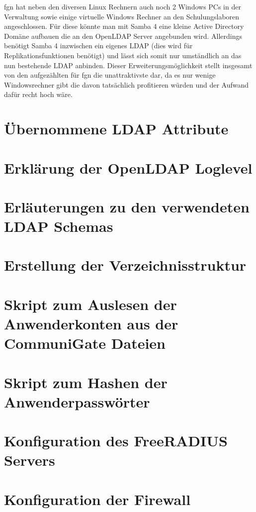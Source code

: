 \documentclass[11pt,a4paper,titlepage=firstiscover]{scrartcl} %
\begin{document}
fgn hat neben den diversen Linux Rechnern auch noch 2 Windows PCs in der Verwaltung sowie einige virtuelle Windows Rechner an den Schulungslaboren angeschlossen. Für diese könnte man mit Samba 4 eine kleine Active Directory Domäne aufbauen die an den OpenLDAP Server angebunden wird. Allerdings benötigt Samba 4 inzwischen ein eigenes LDAP (dies wird für Replikationsfunktionen benötigt) und lässt sich somit nur umständlich an das nun bestehende LDAP anbinden. Dieser Erweiterungsmöglichkeit stellt insgesamt von den aufgezählten für fgn die unattraktivste dar, da es nur wenige Windowsrechner gibt die davon tatsächlich profitieren würden und der Aufwand dafür recht hoch wäre.


\appendix
\newpage
{} %
\section{Übernommene LDAP Attribute} \label{sec:LDAP-Attribute}
\newpage
\section{Erklärung der OpenLDAP Loglevel} \label{sec:LDAP-Loglevel}
\newpage
\section{Erläuterungen zu den verwendeten LDAP Schemas}\label{sec:LDAP-Schema}
\newpage
\section{Erstellung der Verzeichnisstruktur}\label{sec:Erstelle-DB}
\newpage
\section{Skript zum Auslesen der Anwenderkonten aus der CommuniGate Dateien}\label{sec:SkriptA}
\newpage
\section{Skript zum Hashen der Anwenderpasswörter}\label{sec:SkriptB}
\newpage
\section{Konfiguration des FreeRADIUS Servers}\label{sec:RADIUS-Konfig}
\newpage
\section{Konfiguration der Firewall}\label{sec:Firewall-Konfig}
\newpage
\end{document}

